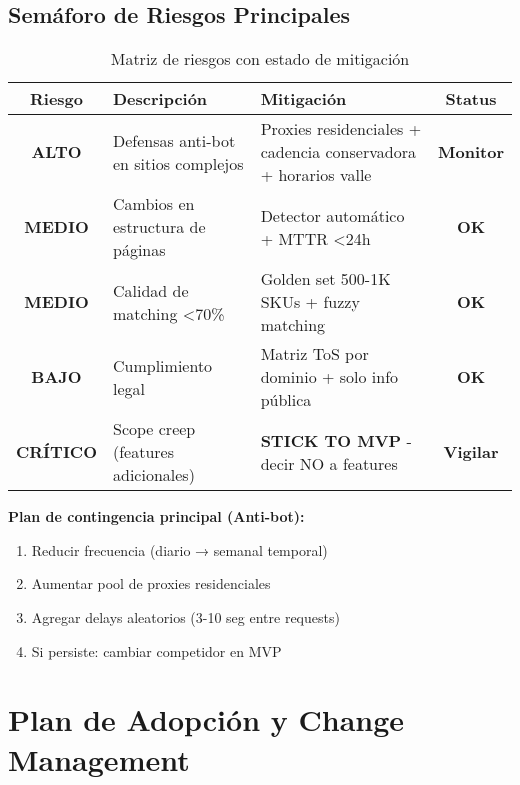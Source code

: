 \documentclass[12pt,a4paper]{article}
\begin{document}
\subsection{Semáforo de Riesgos Principales}

\begin{table}[h]
\centering
\small
\begin{tabularx}{\textwidth}{|c|X|X|c|}
\hline
\rowcolor{lightgray}
\textbf{Riesgo} & \textbf{Descripción} & \textbf{Mitigación} & \textbf{Status} \\
\hline
\cellcolor{dangerred!30}\textbf{ALTO} & Defensas anti-bot en sitios complejos & Proxies residenciales + cadencia conservadora + horarios valle & \textcolor{warningyellow}{\textbf{Monitor}} \\
\hline
\cellcolor{warningyellow!30}\textbf{MEDIO} & Cambios en estructura de páginas & Detector automático + MTTR <24h & \textcolor{successgreen}{\textbf{OK}} \\
\hline
\cellcolor{warningyellow!30}\textbf{MEDIO} & Calidad de matching <70\% & Golden set 500-1K SKUs + fuzzy matching & \textcolor{successgreen}{\textbf{OK}} \\
\hline
\cellcolor{successgreen!30}\textbf{BAJO} & Cumplimiento legal & Matriz ToS por dominio + solo info pública & \textcolor{successgreen}{\textbf{OK}} \\
\hline
\cellcolor{dangerred!30}\textbf{CRÍTICO} & Scope creep (features adicionales) & \textbf{STICK TO MVP} - decir NO a features & \textcolor{dangerred}{\textbf{Vigilar}} \\
\hline
\end{tabularx}
\caption{Matriz de riesgos con estado de mitigación}
\end{table}

\textbf{Plan de contingencia principal (Anti-bot):}
\begin{enumerate}[leftmargin=*]
    \item Reducir frecuencia (diario → semanal temporal)
    \item Aumentar pool de proxies residenciales
    \item Agregar delays aleatorios (3-10 seg entre requests)
    \item Si persiste: cambiar competidor en MVP
\end{enumerate}

\newpage
\section{Plan de Adopción y Change Management}
\end{document}
